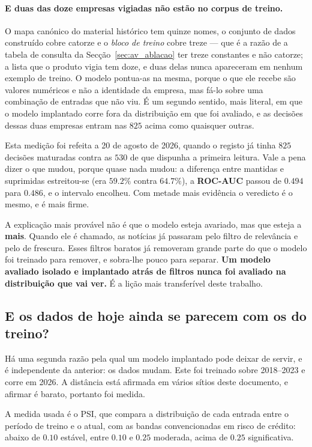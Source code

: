 \paragraph{E duas das doze empresas vigiadas não estão no corpus de treino.}
O mapa canónico do material histórico tem quinze nomes, o conjunto de dados construído cobre
catorze e o \emph{bloco de treino} cobre treze --- que é a razão de a tabela de consulta da
Secção~\ref{sec:av_ablacao} ter treze constantes e não catorze; a lista que o
produto vigia tem doze, e duas delas nunca apareceram em nenhum exemplo de treino. O modelo
pontua-as na mesma, porque o que ele recebe são valores numéricos e não a identidade da empresa,
mas fá-lo sobre uma combinação de entradas que não viu. É um segundo sentido, mais literal, em que
o modelo implantado corre fora da distribuição em que foi avaliado, e as decisões dessas duas
empresas entram nas $825$ acima como quaisquer outras.

Esta medição foi refeita a 20 de agosto de 2026, quando o registo já tinha $825$ decisões
maturadas contra as $530$ de que dispunha a primeira leitura. Vale a pena dizer o que mudou,
porque quase nada mudou: a diferença entre mantidas e suprimidas estreitou-se (era $59.2\%$
contra $64.7\%$), a \textbf{ROC-AUC} passou de $0.494$ para $0.486$, e o intervalo encolheu.
Com metade mais evidência o veredicto é o mesmo, e é mais firme.

A explicação mais provável não é que o modelo esteja avariado, mas que esteja a \textbf{mais}.
Quando ele é chamado, as notícias já passaram pelo filtro de relevância e pelo de frescura. Esses
filtros baratos já removeram grande parte do que o modelo foi treinado para remover, e sobra-lhe
pouco para separar. \textbf{Um modelo avaliado isolado e implantado atrás de filtros nunca foi
avaliado na distribuição que vai ver.} É a lição mais transferível deste trabalho.

\subsection{E os dados de hoje ainda se parecem com os do treino?}
\label{sec:av_deriva}

Há uma segunda razão pela qual um modelo implantado pode deixar de servir, e é independente da
anterior: os dados mudam. Este foi treinado sobre 2018--2023 e corre em 2026. A distância está
afirmada em vários sítios deste documento, e afirmar é barato, portanto foi medida.

A medida usada é o \gls{PSI}, que compara a distribuição de cada entrada entre o período de treino
e o atual, com as bandas convencionadas em risco de crédito: abaixo de $0.10$ estável, entre
$0.10$ e $0.25$ moderada, acima de $0.25$ significativa.

